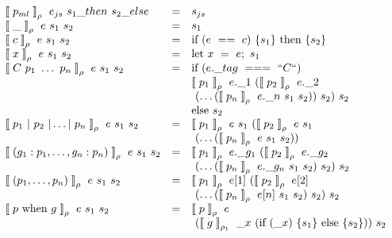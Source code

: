 \begin{center}
$
\begin{array}{lll}
\llpar p_{ml} \rrpar _{\rho} ~ e_{js} ~ s_1\_then ~ s_2\_else &=& s_{js} \\
\llpar \_ \rrpar _{\rho} ~ e ~ s_1 ~ s_2 &=& s_1 \\
\llpar c \rrpar _{\rho} ~ e ~ s_1 ~ s_2 &=& \mbox{if} ~(e ~==~ c)~ \{ s_1 \} ~ \mbox{then} ~ \{ s_2 \} \\
\llpar x \rrpar _{\rho} ~ e ~ s_1 ~ s_2 &=& \mbox{let} ~ x ~=~ e; ~ s_1 \\

\llpar C~p_1 ~\ldots~ p_n \rrpar _{\rho} ~ e ~ s_1 ~ s_2 &=& \mbox{if} ~(e.\_tag ~===~ ``C``)\\ 
& & \llpar p_1 \rrpar _{\rho} ~ e.\_1 ~ (\llpar p_2 \rrpar _{\rho} ~ e.\_2 ~ \\ & & ~(\ldots (\llpar p_n \rrpar _{\rho} ~e.\_n ~ s_1 ~ s_2)) ~s_2)~s_2 \\
& & \mbox{else} ~ s_2 \\

\llpar p_1~|~p_2~|\ldots|~p_n \rrpar _{\rho} ~ e ~ s_1 ~ s_2 &=& \llpar p_1 \rrpar _{\rho} ~ e ~ s_1 ~ (\llpar p_2 \rrpar _{\rho} ~ e ~ s_1 ~\\ & & ~(\ldots (\llpar p_n \rrpar _{\rho} ~ e ~ s_1 ~ s_2)) \\

\llpar (g_1:p_1, \ldots, g_n:p_n) \rrpar _{\rho} ~ e ~ s_1 ~ s_2 &=& \llpar p_1 \rrpar _{\rho} ~ e.\_g_1 ~ (\llpar p_2 \rrpar _{\rho} ~ e.\_g_2 ~\\ & & ~(\ldots (\llpar p_n \rrpar _{\rho} ~ e.\_g_n ~ s_1 ~ s_2) ~ s_2)~ s_2 \\

\llpar (p_1, \ldots, p_n)  \rrpar _{\rho} ~ e ~ s_1 ~ s_2 &=& \llpar p_1 \rrpar _{\rho} ~ e[1] ~ (\llpar p_2 \rrpar _{\rho} ~ e[2] ~\\ & & ~(\ldots (\llpar p_n \rrpar _{\rho} ~ e[n] ~ s_1 ~ s_2) ~ s_2)~ s_2 \\

\llpar p ~ \mbox{when} ~ g \rrpar _{\rho} ~ e ~ s_1 ~ s_2 &=& \llpar p \rrpar _{\rho} ~ e ~\\ & & ~ (\llpar g \rrpar _{\rho_1} ~ \_x ~ (\mbox{if} ~ (\_x) ~ \{ s_1 \} ~ \mbox{else} ~ \{ s_2 \})) ~s_2
\end{array}
$
\captionsetup{type=lstlisting}
\label{tbl:tr_pm}
\end{center}
 

